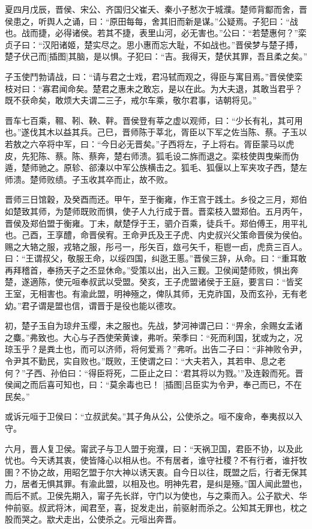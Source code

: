 \documentclass[a4paper,12pt,UTF8,twoside]{ctexbook}
\begin{document}
夏四月戊辰，晋侯、宋公、齐国归父崔夭、秦小子慭次于城濮。楚师背酅而舍，晋侯患之，听舆人之诵，曰：“原田每每，舍其旧而新是谋。”公疑焉。子犯曰：“战也。战而捷，必得诸侯。若其不捷，表里山河，必无害也。”公曰：“若楚惠何？”栾贞子曰：“汉阳诸姬，楚实尽之。思小惠而忘大耻，不如战也。”晋侯梦与楚子搏，楚子伏己而[插图]其脑，是以惧。子犯曰：“吉。我得天，楚伏其罪，吾且柔之矣。”

子玉使鬥勃请战，曰：“请与君之士戏，君冯轼而观之，得臣与寓目焉。”晋侯使栾枝对曰：“寡君闻命矣。楚君之惠未之敢忘，是以在此。为大夫退，其敢当君乎？既不获命矣，敢烦大夫谓二三子，戒尔车乘，敬尔君事，诘朝将见。”

晋车七百乘，韅、靷、鞅、靽。晋侯登有莘之虚以观师，曰：“少长有礼，其可用也。”遂伐其木以益其兵。己巳，晋师陈于莘北，胥臣以下军之佐当陈、蔡。子玉以若敖之六卒将中军，曰：“今日必无晋矣。”子西将左，子上将右。胥臣蒙马以虎皮，先犯陈、蔡。陈、蔡奔，楚右师溃。狐毛设二旆而退之。栾枝使舆曳柴而伪遁，楚师驰之。原轸、郤溱以中军公族横击之。狐毛、狐偃以上军夹攻子西，楚左师溃。楚师败绩。子玉收其卒而止，故不败。

晋师三日馆穀，及癸酉而还。甲午，至于衡雍，作王宫于践土。乡役之三月，郑伯如楚致其师，为楚师既败而惧，使子人九行成于晋。晋栾枝入盟郑伯。五月丙午，晋侯及郑伯盟于衡雍。丁未，献楚俘于王，驷介百乘，徒兵千。郑伯傅王，用平礼也。己酉，王享醴，命晋侯宥。王命尹氏及王子虎、内史叔兴父策命晋侯为侯伯。赐之大辂之服，戎辂之服，彤弓一，彤矢百，玈弓矢千，秬鬯一卣，虎贲三百人。曰：“王谓叔父，敬服王命，以绥四国，纠逖王慝。”晋侯三辞，从命。曰：“重耳敢再拜稽首，奉扬天子之丕显休命。”受策以出，出入三觐。卫侯闻楚师败，惧出奔楚，遂適陈，使元咺奉叔武以受盟。癸亥，王子虎盟诸侯于王庭，要言曰：“皆奖王室，无相害也。有渝此盟，明神殛之，俾队其师，无克祚国，及而玄孙，无有老幼。”君子谓是盟也信，谓晋于是役也能以德攻。

初，楚子玉自为琼弁玉缨，未之服也。先战，梦河神谓己曰：“畀余，余赐女孟诸之麋。”弗致也。大心与子西使荣黄谏，弗听。荣季曰：“死而利国，犹或为之，况琼玉乎？是粪土也，而可以济师，将何爱焉？”弗听。出告二子曰：“非神败令尹，令尹其不勤民，实自败也。”既败，王使谓之曰：“大夫若入，其若申、息之老何？”子西、孙伯曰：“得臣将死，二臣止之曰：‘君其将以为戮。’”及连穀而死。晋侯闻之而后喜可知也，曰：“莫余毒也已！ [插图]吕臣实为令尹，奉己而已，不在民矣。”

或诉元咺于卫侯曰：“立叔武矣。”其子角从公，公使杀之。咺不废命，奉夷叔以入守。

六月，晋人复卫侯。甯武子与卫人盟于宛濮，曰：“天祸卫国，君臣不协，以及此忧也。今天诱其衷，使皆降心以相从也。不有居者，谁守社稷？不有行者，谁扞牧圉？不协之故，用昭乞盟于尔大神以诱天衷。自今日以往，既盟之后，行者无保其力，居者无惧其罪。有渝此盟，以相及也。明神先君，是纠是殛。”国人闻此盟也，而后不贰。卫侯先期入，甯子先长牂，守门以为使也，与之乘而入。公子歂犬、华仲前驱。叔武将沐，闻君至，喜，捉发走出，前驱射而杀之。公知其无罪也，枕之股而哭之。歂犬走出，公使杀之。元咺出奔晋。
\end{document}
